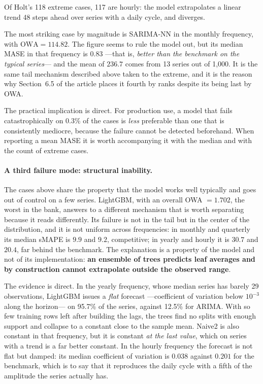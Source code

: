 Of Holt's 118 extreme cases, 117 are hourly: the model extrapolates a linear trend 48
steps ahead over series with a daily cycle, and diverges.

The most striking case by magnitude is SARIMA-NN in the monthly frequency, with
$\mathrm{OWA}=114.82$. The figure seems to rule the model out, but its median MASE in
that frequency is $0.83$ ---that is, \emph{better than the benchmark on the typical
series}--- and the mean of $236.7$ comes from 13 series out of 1{,}000. It is the same
tail mechanism described above taken to the extreme, and it is the reason why
Section~6.5 of the article places it fourth by ranks despite its being last by OWA.

The practical implication is direct. For production use, a model that fails
catastrophically on 0.3\% of the cases is \emph{less} preferable than one that is
consistently mediocre, because the failure cannot be detected beforehand. When reporting
a mean MASE it is worth accompanying it with the median and with the count of extreme
cases.

\paragraph{A third failure mode: structural inability.} The cases above share the
property that the model works well typically and goes out of control on a few series.
LightGBM, with an overall OWA $=1.702$, the worst in the bank, answers to a different
mechanism that is worth separating because it reads differently. Its failure is not in
the tail but in the center of the distribution, and it is not uniform across
frequencies: in monthly and quarterly its median sMAPE is $9.9$ and $9.2$, competitive;
in yearly and hourly it is $30.7$ and $20.4$, far behind the benchmark. The explanation
is a property of the model and not of its implementation: \textbf{an ensemble of trees
predicts leaf averages and by construction cannot extrapolate outside the observed
range}.

The evidence is direct. In the yearly frequency, whose median series has barely 29
observations, LightGBM issues a \emph{flat} forecast ---coefficient of variation below
$10^{-3}$ along the horizon--- on 95.7\% of the series, against 12.5\% for ARIMA. With
so few training rows left after building the lags, the trees find no splits with enough
support and collapse to a constant close to the sample mean. Naive2 is also constant in
that frequency, but it is constant \emph{at the last value}, which on series with a
trend is a far better constant. In the hourly frequency the forecast is not flat but
damped: its median coefficient of variation is $0.038$ against $0.201$ for the
benchmark, which is to say that it reproduces the daily cycle with a fifth of the
amplitude the series actually has.

